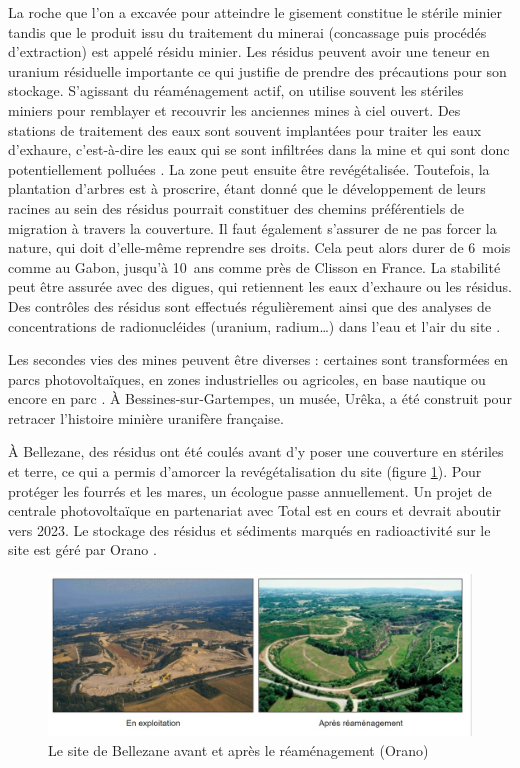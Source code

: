 \documentclass{article}
\begin{document}
La roche que l’on a excavée pour atteindre le gisement constitue le stérile minier tandis que le produit issu du traitement du minerai (concassage puis procédés d'extraction) est appelé résidu minier. Les résidus peuvent avoir une teneur en uranium résiduelle importante ce qui justifie de prendre des précautions pour son stockage.
S'agissant du réaménagement actif, on utilise souvent les stériles miniers pour remblayer et recouvrir les anciennes mines à ciel ouvert.
Des stations de traitement des eaux sont souvent implantées pour traiter les eaux d’exhaure, c'est-à-dire les eaux qui se sont infiltrées dans la mine et qui sont donc potentiellement polluées \cite{schick_les_2020}.
La zone peut ensuite être revégétalisée. Toutefois, la plantation d'arbres est à proscrire, étant donné que le développement de leurs racines au sein des résidus pourrait constituer des chemins préférentiels de migration à travers la couverture. Il faut également s’assurer de ne pas forcer la nature, qui doit d’elle-même reprendre ses droits. Cela peut alors durer de 6~mois comme au Gabon, jusqu'à 10~ans comme près de Clisson en France. La stabilité peut être assurée avec des digues, qui retiennent les eaux d’exhaure ou les résidus. Des contrôles des résidus sont effectués régulièrement ainsi que des analyses de concentrations de radionucléides (uranium, radium…) dans l’eau et l’air du site \cite{himeur_apres-mine_2020}.

Les secondes vies des mines peuvent être diverses : certaines sont transformées en parcs photovoltaïques, en zones industrielles ou agricoles, en base nautique ou encore en parc \cite{himeur_apres-mine_2020}. À Bessines-sur-Gartempes, un musée, Urêka, a été construit pour retracer l'histoire minière uranifère française.

À Bellezane, des résidus ont été coulés avant d’y poser une couverture en stériles et terre, ce qui a permis d'amorcer la revégétalisation du site (figure \ref{fig:bellezane_avant_apres}). Pour protéger les fourrés et les mares, un écologue passe annuellement. Un projet de centrale photovoltaïque en partenariat avec Total est en cours et devrait aboutir vers 2023. Le stockage des résidus et sédiments marqués en radioactivité sur le site est géré par Orano \cite{benesteau_site_2020}.

\begin{figure}[H]
    \centering
    \includegraphics[width=\textwidth]{I_B_2.jpg}
    \caption{Le site de Bellezane avant et après le réaménagement (Orano)}
    \label{fig:bellezane_avant_apres}
\end{figure}
\end{document}
